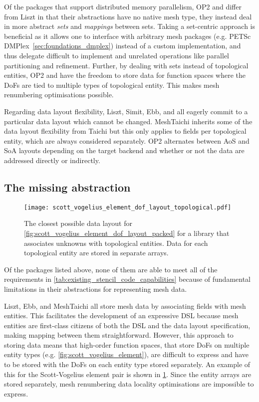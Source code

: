 \documentclass[thesis]{subfiles}
\begin{document}
Of the packages that support distributed memory parallelism, OP2 and  differ from Liszt in that their abstractions have no native mesh type, they instead deal in more abstract \emph{sets} and \emph{mappings} between sets.
Taking a set-centric approach is beneficial as it allows one to interface with arbitrary mesh packages (e.g. PETSc DMPlex~\cref{sec:foundations_dmplex}) instead of a custom implementation, and thus delegate difficult to implement and unrelated operations like parallel partitioning and refinement.
Further, by dealing with sets instead of topological entities, OP2 and  have the freedom to store data for function spaces where the DoFs are tied to multiple types of topological entity.
This makes mesh renumbering optimisations possible.

Regarding data layout flexibility, Liszt, Simit, Ebb, and  all eagerly commit to a particular data layout which cannot be changed.
MeshTaichi inherits some of the data layout flexibility from Taichi but this only applies to fields per topological entity, which are always considered separately.
OP2 alternates between AoS and SoA layouts depending on the target backend and whether or not the data are addressed directly or indirectly.

\subsection{The missing abstraction}
\label{sec:intro_missing_abstraction}

\begin{figure}
  \centering
  \texttt{[image: scott\_vogelius\_element\_dof\_layout\_topological.pdf]}
  \caption{
    The closest possible data layout for \cref{fig:scott_vogelius_element_dof_layout_packed} for a library that associates unknowns with topological entities.
    Data for each topological entity are stored in separate arrays.
  }
  \label{fig:scott_vogelius_element_dof_layout_topological}
\end{figure}

Of the packages listed above, none of them are able to meet all of the requirements in \cref{tab:existing_stencil_code_capabilities} because of fundamental limitations in their abstractions for representing mesh data.

Liszt, Ebb, and MeshTaichi all store mesh data by associating fields with mesh entities.
This facilitates the development of an expressive DSL because mesh entities are first-class citizens of both the DSL and the data layout specification, making mapping between them straightforward.
However, this approach to storing data means that high-order function spaces, that store DoFs on multiple entity types (e.g. \cref{fig:scott_vogelius_element}), are difficult to express and have to be stored with the DoFs on each entity type stored separately.
An example of this for the Scott-Vogelius element pair is shown in \cref{fig:scott_vogelius_element_dof_layout_topological}.
Since the entity arrays are stored separately, mesh renumbering data locality optimisations are impossible to express.
\end{document}
